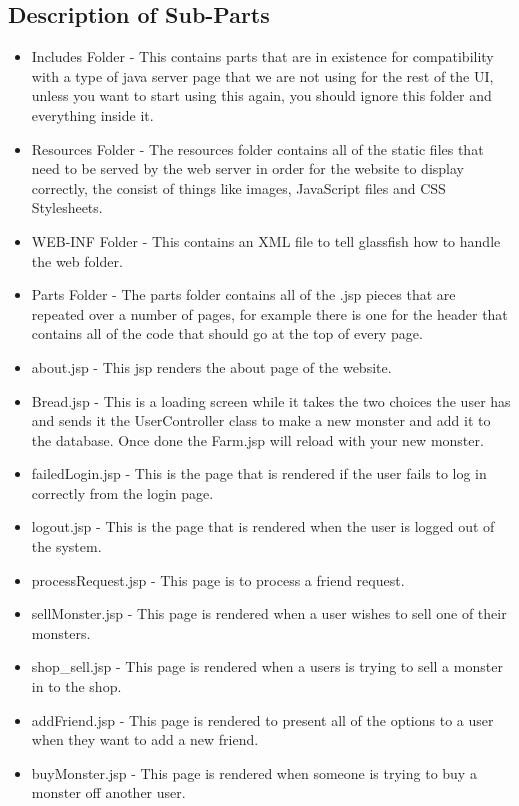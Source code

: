 \documentclass[titlepage]{article}
\begin{document}
{\subsection {Description of Sub-Parts}
\begin{itemize}
\item {Includes Folder - This contains parts that are in existence for compatibility with a type of java server page that we are not using for the rest of the UI, unless you want to start using this again, you should ignore this folder and everything inside it.}
\item {Resources Folder - The resources folder contains all of the static files that need to be served by the web server in order for the website to display correctly, the consist of things like images, JavaScript files and CSS Stylesheets.}
\item {WEB-INF Folder - This contains an XML file to tell glassfish how to handle the web folder.}
\item {Parts Folder - The parts folder contains all of the .jsp pieces that are repeated over a number of pages, for example there is one for the header that contains all of the code that should go at the top of every page.}
\item {about.jsp - This jsp renders the about page of the website.}
\item {Bread.jsp - This is a loading screen while it takes the two choices the user has and sends it the UserController class to make a new monster and add it to the database. Once done the Farm.jsp will reload with your new monster.}
\item {failedLogin.jsp - This is the page that is rendered if the user fails to log in correctly from the login page.}
\item {logout.jsp - This is the page that is rendered when the user is logged out of the system.}
\item {processRequest.jsp - This page is to process a friend request.}
\item {sellMonster.jsp - This page is rendered when a user wishes to sell one of their monsters.}
\item {shop\_sell.jsp - This page is rendered when a users is trying to sell a monster in to the shop.}
\item {addFriend.jsp - This page is rendered to present all of the options to a user when they want to add a new friend.}
\item {buyMonster.jsp - This page is rendered when someone is trying to buy a monster off another user.}

\end{itemize}}
\end{document}
